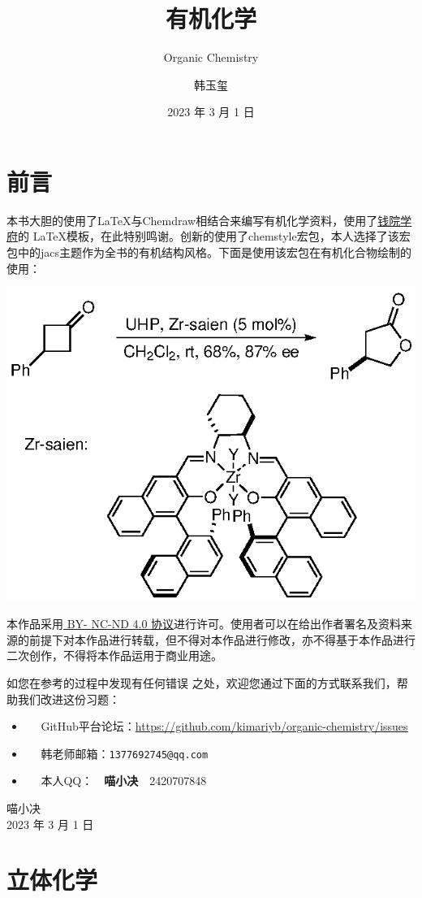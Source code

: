 \documentclass[
  10pt,
  twoside,
  openany,
  b5paper, %
  colorscheme = basic, %
]{qyxf-book}
\title{有机化学}
\subtitle{Organic Chemistry}  %
\author{韩玉玺}
\date{2023 年 3 月 1 日}
\begin{document}
\maketitle

\chapter*{前言}

本书大胆的使用了\LaTeX 与Chemdraw相结合来编写有机化学资料，使用了\href{https://github.com/qyxf/qyxf-book}{钱院学府}的 \LaTeX 模板，在此特别鸣谢。创新的使用了chemstyle宏包，本人选择了该宏包中的jacs主题作为全书的有机结构风格。下面是使用该宏包在有机化合物绘制的使用：

\begin{scheme}[ht]
	\includegraphics{eg/eg.eps}
	
\end{scheme}

本作品采用\href{https://
	creativecommons.org/licenses/
	by-nc-nd/4.0/}{ BY-
	NC-ND 4.0 协议}进行许可。使用者可以在给出作者署名及资料来源的前提下对本作品进行转载，但不得对本作品进行修改，亦不得基于本作品进行二次创作，不得将本作品运用于商业用途。

如您在参考的过程中发现有任何错误
之处，欢迎您通过下面的方式联系我们，帮助我们改进这份习题：
\begin{itemize}
	\item \faGithub ~~ GitHub平台论坛：\url{https://github.com/kimariyb/organic-chemistry/issues}
	\item \faEnvelopeOpen ~~ 韩老师邮箱：\texttt{1377692745@qq.com}
	\item \faQq ~~ 
	本人QQ：~~\textbf{喵小决}~~2420707848
\end{itemize}

\begin{flushright}
	喵小决\\
	2023 年 3 月 1 日
\end{flushright}

\cleardoublepage

\tableofcontents

\chapter{立体化学}
\end{document}

